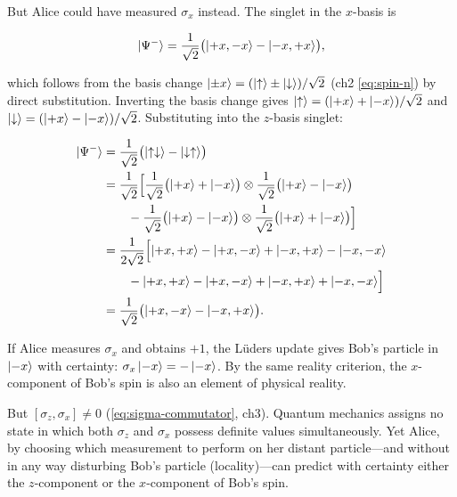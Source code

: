 But Alice could have measured $\sigma_x$ instead. The singlet in the $x$-basis is
\begin{linenomath}
\begin{equation}
\ket{\Psi^-} = \frac{1}{\sqrt{2}}\bigl(\ket{+x,-x} - \ket{-x,+x}\bigr),
\end{equation}
\end{linenomath}
which follows from the basis change $\ket{\pm x} = (\ket{\uparrow} \pm \ket{\downarrow})/\sqrt{2}$ (ch2 \eqref{eq:spin-n}) by direct substitution. Inverting the basis change gives $\ket{\uparrow} = (\ket{+x} + \ket{-x})/\sqrt{2}$ and $\ket{\downarrow} = (\ket{+x} - \ket{-x})/\sqrt{2}$. Substituting into the $z$-basis singlet:
\begin{linenomath}
\begin{align}
\ket{\Psi^-} &= \frac{1}{\sqrt{2}}\bigl(\ket{\uparrow\downarrow} - \ket{\downarrow\uparrow}\bigr) \\
&= \frac{1}{\sqrt{2}}\Bigl[
\frac{1}{\sqrt{2}}\bigl(\ket{+x}+\ket{-x}\bigr) \otimes \frac{1}{\sqrt{2}}\bigl(\ket{+x}-\ket{-x}\bigr) \\
&\qquad - \frac{1}{\sqrt{2}}\bigl(\ket{+x}-\ket{-x}\bigr) \otimes \frac{1}{\sqrt{2}}\bigl(\ket{+x}+\ket{-x}\bigr)
\Bigr] \\
&= \frac{1}{2\sqrt{2}}\Bigl[
\ket{+x,+x} - \ket{+x,-x} + \ket{-x,+x} - \ket{-x,-x} \\
&\qquad - \ket{+x,+x} - \ket{+x,-x} + \ket{-x,+x} + \ket{-x,-x}
\Bigr] \\
&= \frac{1}{\sqrt{2}}\bigl(\ket{+x,-x} - \ket{-x,+x}\bigr).
\end{align}
\end{linenomath}
If Alice measures $\sigma_x$ and obtains $+1$, the L\"uders update gives Bob's particle in $\ket{-x}$ with certainty: $\sigma_x\ket{-x} = -\ket{-x}$. By the same reality criterion, the $x$-component of Bob's spin is also an element of physical reality.

But $[\sigma_z, \sigma_x] \neq 0$ (\eqref{eq:sigma-commutator}, ch3). Quantum mechanics assigns no state in which both $\sigma_z$ and $\sigma_x$ possess definite values simultaneously. Yet Alice, by choosing which measurement to perform on her distant particle---and without in any way disturbing Bob's particle (locality)---can predict with certainty either the $z$-component or the $x$-component of Bob's spin.

